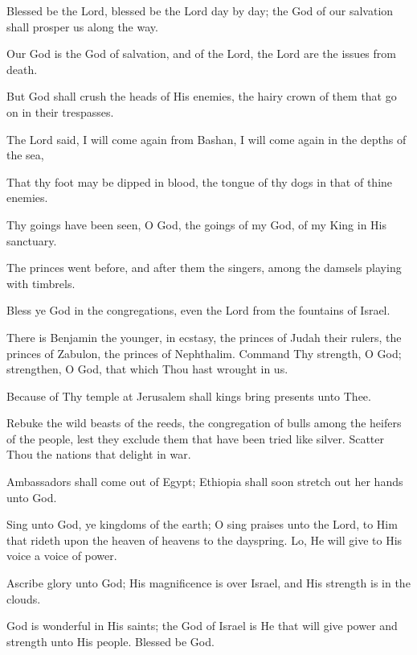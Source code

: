 Blessed be the Lord, blessed be the Lord day by day; the God of our salvation shall prosper us along the way.

Our God is the God of salvation, and of the Lord, the Lord are the issues from death.

But God shall crush the heads of His enemies, the hairy crown of them that go on in their trespasses.

The Lord said, I will come again from Bashan, I will come again in the depths of the sea,

That thy foot may be dipped in blood, the tongue of thy dogs in that of thine enemies.

Thy goings have been seen, O God, the goings of my God, of my King in His sanctuary.

The princes went before, and after them the singers, among the damsels playing with timbrels.

Bless ye God in the congregations, even the Lord from the fountains of Israel.

There is Benjamin the younger, in ecstasy, the princes of Judah their rulers, the princes of Zabulon, the princes of Nephthalim. Command Thy strength, O God; strengthen, O God, that which Thou hast wrought in us.

Because of Thy temple at Jerusalem shall kings bring presents unto Thee.

Rebuke the wild beasts of the reeds, the congregation of bulls among the heifers of the people, lest they exclude them that have been tried like silver. Scatter Thou the nations that delight in war.

Ambassadors shall come out of Egypt; Ethiopia shall soon stretch out her hands unto God.

Sing unto God, ye kingdoms of the earth; O sing praises unto the Lord, to Him that rideth upon the heaven of heavens to the dayspring. Lo, He will give to His voice a voice of power.

Ascribe glory unto God; His magnificence is over Israel, and His strength is in the clouds.

God is wonderful in His saints; the God of Israel is He that will give power and strength unto His people. Blessed be God.

